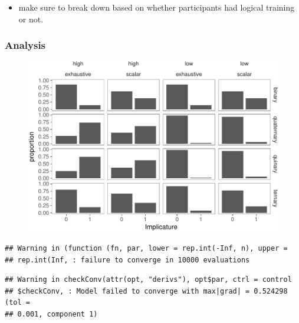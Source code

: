 \documentclass[floatsintext,man]{apa6}
\providecommand{\tightlist}{%
  \setlength{\itemsep}{0pt}\setlength{\parskip}{0pt}}
\theoremstyle{definition}
\theoremstyle{definition}
\theoremstyle{definition}
\theoremstyle{remark}
\begin{document}
\begin{itemize}
\tightlist
\item
  make sure to break down based on whether participants had logical
  training or not.
\end{itemize}

\subsubsection{Analysis}\label{analysis}

\begin{figure}
\centering
\includegraphics{writeup_files/figure-latex/unnamed-chunk-3-1.pdf}
\caption{}
\end{figure}

\begin{verbatim}
## Warning in (function (fn, par, lower = rep.int(-Inf, n), upper =
## rep.int(Inf, : failure to converge in 10000 evaluations
\end{verbatim}

\begin{verbatim}
## Warning in checkConv(attr(opt, "derivs"), opt$par, ctrl = control
## $checkConv, : Model failed to converge with max|grad| = 0.524298 (tol =
## 0.001, component 1)
\end{verbatim}
\end{document}
